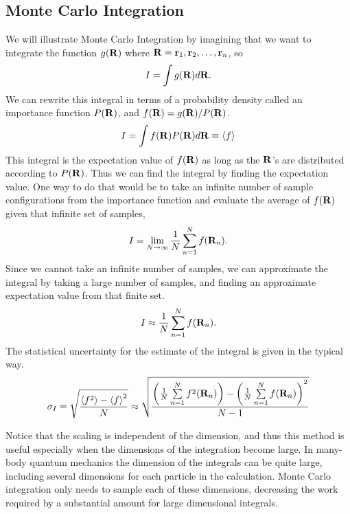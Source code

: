 \subsection{Monte Carlo Integration}
We will illustrate Monte Carlo Integration by imagining that we want to integrate the function $g(\mathbf{R})$ where $\mathbf{R}=\mathbf{r}_1,\mathbf{r}_2,\ldots,\mathbf{r}_n$, so 
\begin{equation}
   I=\int g(\mathbf{R}) d\mathbf{R}.
\end{equation}
We can rewrite this integral in terms of a probability density called an importance function $P(\mathbf{R})$, and $f(\mathbf{R}) = g(\mathbf{R})/P(\mathbf{R})$.
\begin{equation}
   I=\int f(\mathbf{R}) P(\mathbf{R}) d\mathbf{R} \equiv \left< f \right>
   \label{equ:mci}
\end{equation}
This integral is the expectation value of $f(\mathbf{R})$ as long as the $\mathbf{R}$'s are distributed according to $P(\mathbf{R})$. Thus we can find the integral by finding the expectation value. One way to do that would be to take an infinite number of sample configurations from the importance function and evaluate the average of $f(\mathbf{R})$ given that infinite set of samples,
\begin{equation}
   I=\lim\limits_{N\rightarrow\infty} \frac{1}{N} \sum\limits_{n=1}^N f(\mathbf{R}_n).
\end{equation}
Since we cannot take an infinite number of samples, we can approximate the integral by taking a large number of samples, and finding an approximate expectation value from that finite set.
\begin{equation}
   I \approx \frac{1}{N} \sum\limits_{n=1}^N f(\mathbf{R}_n).
\end{equation}
The statistical uncertainty for the estimate of the integral is given in the typical way.
\begin{equation}
   \sigma_{I} = \sqrt{\frac{\left< f^2 \right>-\left< f \right>^2}{N}} \approx \sqrt{\frac{\left(\frac{1}{N}\sum\limits_{n=1}^Nf^2(\mathbf{R}_n)\right) - \left(\frac{1}{N}\sum\limits_{n=1}^Nf(\mathbf{R}_n)\right)^2}{N-1}}
\end{equation}

Notice that the scaling is independent of the dimension, and thus this method is useful especially when the dimensions of the integration become large. In many-body quantum mechanics the dimension of the integrals can be quite large, including several dimensions for each particle in the calculation. Monte Carlo integration only needs to sample each of these dimensions, decreasing the work required by a substantial amount for large dimensional integrals.

